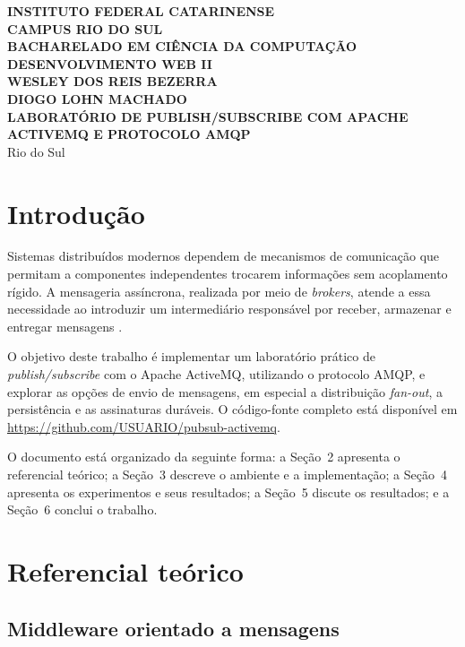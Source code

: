 \documentclass[12pt,a4paper]{article}
\newcommand{\disciplina}{DESENVOLVIMENTO WEB II}
\newcommand{\professor}{WESLEY DOS REIS BEZERRA}
\newcommand{\repositorio}{https://github.com/USUARIO/pubsub-activemq}
\begin{document}
\begin{titlepage}
\centering
\textbf{INSTITUTO FEDERAL CATARINENSE\\CAMPUS RIO DO SUL\\BACHARELADO EM CIÊNCIA DA COMPUTAÇÃO}\\[1.5cm]
\textbf{\disciplina}\\[0.5cm]
\textbf{\professor}\\[4cm]
\textbf{DIOGO LOHN MACHADO}\\[3cm]
{\Large\textbf{LABORATÓRIO DE PUBLISH/SUBSCRIBE COM APACHE ACTIVEMQ E PROTOCOLO AMQP}}\\[3cm]
\vfill
Rio do Sul\\\the\year
\end{titlepage}





\section{Introdução}

Sistemas distribuídos modernos dependem de mecanismos de comunicação que permitam a componentes independentes trocarem informações sem acoplamento rígido. A mensageria assíncrona, realizada por meio de \textit{brokers}, atende a essa necessidade ao introduzir um intermediário responsável por receber, armazenar e entregar mensagens \cite{snyder2011}.

O objetivo deste trabalho é implementar um laboratório prático de \textit{publish/subscribe} com o Apache ActiveMQ, utilizando o protocolo AMQP, e explorar as opções de envio de mensagens, em especial a distribuição \textit{fan-out}, a persistência e as assinaturas duráveis. O código-fonte completo está disponível em \url{\repositorio}.

O documento está organizado da seguinte forma: a Seção~2 apresenta o referencial teórico; a Seção~3 descreve o ambiente e a implementação; a Seção~4 apresenta os experimentos e seus resultados; a Seção~5 discute os resultados; e a Seção~6 conclui o trabalho.

\section{Referencial teórico}

\subsection{Middleware orientado a mensagens}
\end{document}
